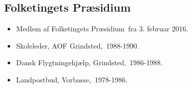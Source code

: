 \documentclass[11pt, a4paper]{awesome-cv}
\begin{document}
\begin{cvletter}
\subsection*{Folketingets Præsidium}
\begin{itemize}
\item Medlem af Folketingets Præsidium fra 3. februar 2016.
\end{itemize}
\begin{itemize}
\item Skoleleder, AOF Grindsted, 1988-1990.
\item Dansk Flygtningehjælp, Grindsted, 1986-1988.
\item Landpostbud, Vorbasse, 1978-1986.
\end{itemize}
\end{cvletter}
\end{document}
